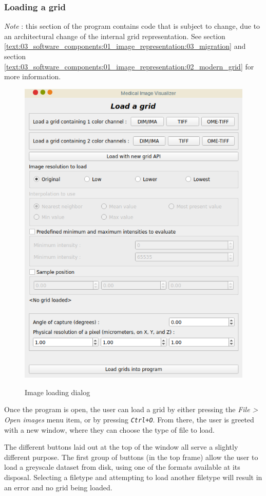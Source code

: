 {	%
	\subsubsection*{Loading a grid}
	{
	\textit{Note} : this section of the program contains code that is subject to change, due to an architectural change of the internal grid representation. See section \ref{text:03_software_components:01_image_representation:03_migration} and section \ref{text:03_software_components:01_image_representation:02_modern_grid} for more information.\par\myparspace
	\begin{figure}[h]
		\centering\label{figure:program_ui_01}
		\includegraphics[width=.6\textwidth]{img/program_01.png}
		\caption{Image loading dialog}
	\end{figure}\par
	Once the program is open, the user can load a grid by either pressing the \textit{File > Open images} menu item, or by pressing \texttt{\textit{Ctrl+O}}. From there, the user is greeted with a new window, where they can choose the type of file to load.\par
	The different buttons laid out at the top of the window all serve a slightly different purpose. The first group of buttons (in the top frame) allow the user to load a greyscale dataset from disk, using one of the formats available at its disposal. Selecting a filetype and attempting to load another filetype will result in an error and no grid being loaded.
}}
